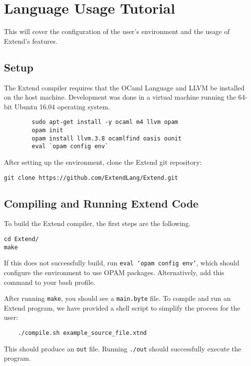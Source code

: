\chapter{Language Usage Tutorial}

This will cover the configuration of the user's environment and the usage of Extend's features.

\section{Setup}
The Extend compiler requires that the OCaml Language and LLVM be installed on the host machine. Development was done in a virtual machine running the 64-bit Ubuntu 16.04 operating system.

	\begin{lstlisting}
		sudo apt-get install -y ocaml m4 llvm opam
		opam init
		opam install llvm.3.8 ocamlfind oasis ounit
		eval `opam config env`
	\end{lstlisting}

	\medskip \noindent After setting up the environment, clone the Extend git repository:

	\begin{lstlisting}
git clone https://github.com/ExtendLang/Extend.git
	\end{lstlisting}

\section{Compiling and Running Extend Code}
To build the Extend compiler, the first steps are the following.

	\begin{lstlisting}
cd Extend/
make
	\end{lstlisting}

	\medskip \noindent
	If this does not successfully build, run \texttt{eval `opam config env`}, which should configure the environment to use OPAM packages. Alternatively, add this command to your bash profile.

	 \medskip \noindent
	 After running \texttt{make}, you should see a \texttt{main.byte} file. To compile and run an Extend program, we have provided a shell script to simplify the process for the user:

	\begin{lstlisting}
	./compile.sh example_source_file.xtnd
	\end{lstlisting}

	\medskip \noindent
	This should produce an \texttt{out} file. Running \texttt{./out} should successfully execute the program.

